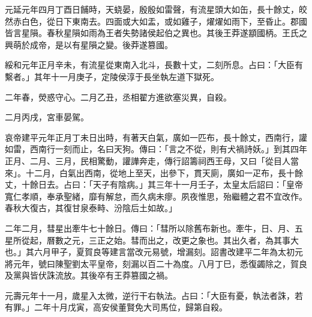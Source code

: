 \begin{pinyinscope}
元延元年四月丁酉日餔時，天蛲晏，殷殷如雷聲，有流星頭大如缶，長十餘丈，皎然赤白色，從日下東南去。四面或大如盂，或如雞子，燿燿如雨下，至昏止。郡國皆言星隕。春秋星隕如雨為王者失勢諸侯起伯之異也。其後王莽遂顓國柄。王氏之興萌於成帝，是以有星隕之變。後莽遂篡國。

綏和元年正月辛未，有流星從東南入北斗，長數十丈，二刻所息。占曰：「大臣有繫者。」其年十一月庚子，定陵侯淳于長坐執左道下獄死。

二年春，熒惑守心。二月乙丑，丞相翟方進欲塞災異，自殺。

二月丙戌，宮車晏駕。

哀帝建平元年正月丁未日出時，有著天白氣，廣如一匹布，長十餘丈，西南行，讙如雷，西南行一刻而止，名曰天狗。傳曰：「言之不從，則有犬禍詩妖。」到其四年正月、二月、三月，民相驚動，讙譁奔走，傳行詔籌祠西王母，又曰「從目人當來」。十二月，白氣出西南，從地上至天，出參下，貫天廁，廣如一疋布，長十餘丈，十餘日去。占曰：「天子有陰病。」其三年十一月壬子，太皇太后詔曰：「皇帝寬仁孝順，奉承聖緒，靡有解怠，而久病未瘳。夙夜惟思，殆繼體之君不宜改作。春秋大復古，其復甘泉泰畤、汾陰后土如故。」

二年二月，彗星出牽牛七十餘日。傳曰：「彗所以除舊布新也。牽牛，日、月、五星所從起，曆數之元，三正之始。彗而出之，改更之象也。其出久者，為其事大也。」其六月甲子，夏賀良等建言當改元易號，增漏刻。詔書改建平二年為太初元將元年，號曰陳聖劉太平皇帝，刻漏以百二十為度。八月丁巳，悉復蠲除之，賀良及黨與皆伏誅流放。其後卒有王莽篡國之禍。

元壽元年十一月，歲星入太微，逆行干右執法。占曰：「大臣有憂，執法者誅，若有罪。」二年十月戊寅，高安侯董賢免大司馬位，歸第自殺。


\end{pinyinscope}